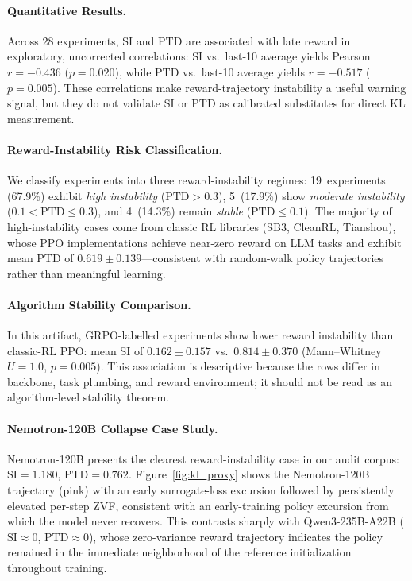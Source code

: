 \paragraph{Quantitative Results.}
Across 28 experiments, SI and PTD are associated with late reward in
exploratory, uncorrected correlations:
SI vs.\ last-10 average yields Pearson $r = -0.436$ ($p = 0.020$),
while PTD vs.\ last-10 average yields $r = -0.517$ ($p = 0.005$).
These correlations make reward-trajectory instability a useful warning signal,
but they do not validate SI or PTD as calibrated substitutes for direct KL
measurement.

\paragraph{Reward-Instability Risk Classification.}
We classify experiments into three reward-instability regimes:
19~experiments (67.9\%) exhibit \emph{high instability}
($\text{PTD} > 0.3$), 5~(17.9\%) show \emph{moderate instability}
($0.1 < \text{PTD} \leq 0.3$), and 4~(14.3\%) remain \emph{stable}
($\text{PTD} \leq 0.1$). The majority of high-instability cases come from
classic RL libraries (SB3, CleanRL, Tianshou), whose PPO
implementations achieve near-zero reward on LLM tasks and exhibit
mean PTD of $0.619 \pm 0.139$---consistent with random-walk policy
trajectories rather than meaningful learning.

\paragraph{Algorithm Stability Comparison.}
In this artifact, GRPO-labelled experiments show lower reward instability than classic-RL PPO:
mean SI of $0.162 \pm 0.157$ vs.\ $0.814 \pm 0.370$
(Mann--Whitney $U = 1.0$, $p = 0.005$).
This association is descriptive because the rows differ in backbone, task
plumbing, and reward environment; it should not be read as an algorithm-level
stability theorem.

\paragraph{Nemotron-120B Collapse Case Study.}
Nemotron-120B presents the clearest reward-instability case in our audit
corpus: $\text{SI} = 1.180$, $\text{PTD} = 0.762$.
Figure~\ref{fig:kl_proxy} shows the Nemotron-120B trajectory
(pink) with an early surrogate-loss excursion followed by persistently
elevated per-step ZVF, consistent with an early-training policy
excursion from which the model never recovers. This contrasts sharply with Qwen3-235B-A22B
($\text{SI} \approx 0$, $\text{PTD} \approx 0$), whose zero-variance
reward trajectory indicates the policy remained in the immediate
neighborhood of the reference initialization throughout training.

